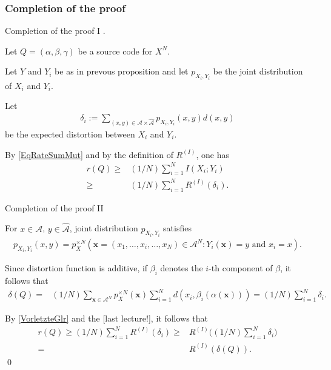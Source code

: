 \subsubsection{Completion of the proof}
\begin{frame}{Completion of the proof I}
.
\bit
\item Let $Q=(\alpha,\beta,\gamma)$ be a source code for $X^N$.
\item Let $Y$ and $Y_i$ be as in prevous proposition and let $p_{X_i,Y_i}$ be the joint distribution of $X_i$ and $Y_i$. 
\item Let 
\begin{align*}
\delta_i:=\sum_{(x,y)\in\mathcal{A}\times\hat{\mathcal{A}}}p_{X_i,Y_i}(x,y)d(x,y)
\end{align*}
be the expected distortion between $X_i$ and $Y_i$. 
\item By \eqref{EqRateSumMut} and by the definition of $R^{(I)}$, one has 
\begin{align}\label{VorletzteGlr}
r(Q)\geq &
(1/N) \sum_{i=1}^NI(X_i;Y_i)\nonumber\\ \geq &(1/N)\sum_{i=1}^NR^{(I)}(\delta_i).
\end{align}
\eit 
\end{frame}


\begin{frame}{Completion of the proof II}

\bit
\item For $x\in\mathcal{A}$, $y\in\widehat{\mathcal{A}}$, joint distribution $p_{X_i,Y_i}$ satisfies
\begin{align*}
p_{X_i,Y_i}(x,y)=p_X^{\times N}(\mathbf{x}=(x_1,\dots,x_i,\dots,x_N)\in\mathcal{A}^N\colon Y_i(\mathbf{x})=y\text{ and $x_i=x$}).%
\end{align*}
\item Since distortion function is additive, 
if $\beta_i$ denotes the $i$-th component of $\beta$, it follows that 
\begin{align*}
\delta(Q)=&(1/N)\sum_{\mathbf{x}\in\mathcal{A}^N}p_X^{\times N}(\mathbf{x})\sum_{i=1}^Nd(x_i,\beta_i(\alpha(\mathbf{x})))=(1/N)\sum_{i=1}^N\delta_i. 
\end{align*} 
\item By \eqref{VorletzteGlr} and the  [last lecture!], it follows that
\begin{align*}%
r(Q)\geq (1/N)\sum_{i=1}^NR^{(I)}(\delta_i)\geq & R^{(I)}\biggl((1/N)\sum_{i=1}^N\delta_i\biggr)\\ =&R^{(I)}(\delta(Q)).
\end{align*}
\qed
\eit
\end{frame}


